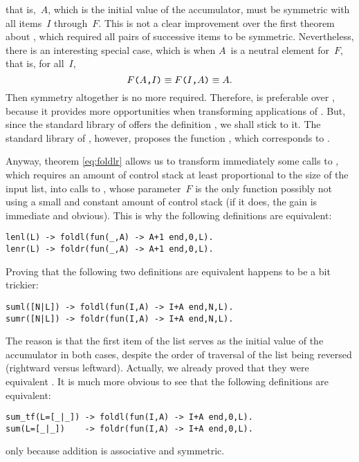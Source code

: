 that is,~\(A\), which is the initial value of the accumulator, must be
symmetric with all items~\(I\) through~\(F\). This is not a clear
improvement over the first theorem about , which
required all pairs of successive items to be symmetric. Nevertheless,
there is an interesting special case, which is when \(A\)~is a neutral
element for~\(F\), that is, for all~\(I\),
\[
\texttt{\(F\)(\(A\),\(I\))}
\mathrel{\equiv}
\texttt{\(F\)(\(I\),\(A\))} \mathrel{\equiv} A.
\]
Then symmetry altogether is no more required. Therefore,
 is preferable over , because
it provides more opportunities when transforming applications of
. But, since the standard library of \Erlang offers
the definition , we shall stick to it. The standard
library of \OCaml, however, proposes the function
, which corresponds to .

Anyway, theorem \eqref{eq:foldlr} allows us to transform immediately
some calls to , which requires an amount of control
stack at least proportional to the size of the input list, into calls
to , whose parameter~\(F\) is the only function
possibly not using a small and constant amount of control stack (if it
does, the gain is immediate and obvious). This is why the following
definitions are equivalent:
\begin{verbatim}
lenl(L) -> foldl(fun(_,A) -> A+1 end,0,L).
lenr(L) -> foldr(fun(_,A) -> A+1 end,0,L).
\end{verbatim}
Proving that the following two definitions are equivalent happens to
be a bit trickier:
\begin{verbatim}
suml([N|L]) -> foldl(fun(I,A) -> I+A end,N,L).
sumr([N|L]) -> foldr(fun(I,A) -> I+A end,N,L).
\end{verbatim}
The reason is that the first item of the list serves as the initial
value of the accumulator in both cases, despite the order of traversal
of the list being reversed (rightward versus leftward). Actually, we
already proved that they were equivalent . It is
much more obvious to see that the following definitions are
equivalent:
\begin{verbatim}
sum_tf(L=[_|_]) -> foldl(fun(I,A) -> I+A end,0,L).
sum(L=[_|_])    -> foldr(fun(I,A) -> I+A end,0,L).
\end{verbatim}
only because addition is associative and symmetric.

\medskip

